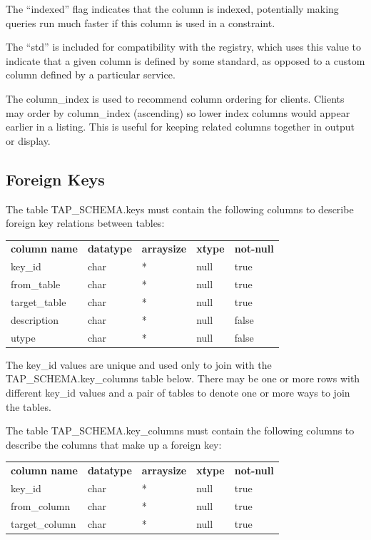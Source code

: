 \documentclass[11pt,letter]{ivoa}
\begin{document}
The “indexed” flag indicates that the column is indexed, potentially 
making queries run much faster if this column is used in a constraint. 

The “std” is included for compatibility with the registry, which uses this value 
to indicate that a given column is defined by some standard, as opposed to a 
custom column defined by a particular service.

The column\_index is used to recommend column ordering for clients. Clients 
may order by column\_index (ascending) so lower index columns would appear 
earlier in a listing. This is useful for keeping related columns together in 
output or display.

\subsection{Foreign Keys}
\label{sec:tap-schema-keys}
The table TAP\_SCHEMA.keys must contain the following columns to 
describe foreign key relations between tables:

\begin{tabular}{l l l l l}
\label{tab:tap-schema-keys}
\textbf{column name} & \textbf{datatype} & \textbf{arraysize} & \textbf{xtype} & \textbf{not-null} \\
key\_id & char & * & null & true \\
from\_table & char & * & null & true \\
target\_table & char & * & null & true \\
description & char & * & null & false \\
utype & char & * & null & false \\
\end{tabular}

The key\_id values are unique and used only to join with the 
TAP\_SCHEMA.key\_columns table below. There may be 
one or more rows with different key\_id values and a pair 
of tables to denote one or more ways to join the tables.

The table TAP\_SCHEMA.key\_columns must contain the 
following columns to describe the columns that make up a foreign key:

\begin{tabular}{l l l l l}
\label{tab:tap-schema-key-columns}
\textbf{column name} & \textbf{datatype} & \textbf{arraysize} & \textbf{xtype} & \textbf{not-null} \\
key\_id & char & * & null & true \\
from\_column & char & * & null & true \\
target\_column & char & * & null & true \\
\end{tabular}
\end{document}

